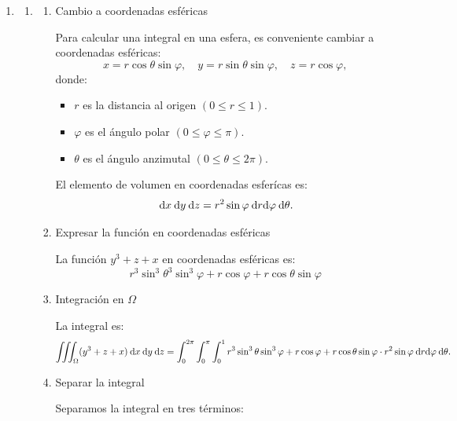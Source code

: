 \begin{enumerate}[label=\color{red}\textbf{\arabic*)}, leftmargin=*]
\item {}
\begin{enumerate}[label=\color{red}\textbf{\alph*)}]
\item {}

  \begin{enumerate}[label=\arabic*)]
    \item Cambio a coordenadas esféricas

      Para calcular una integral en una esfera, es conveniente cambiar a coordenadas esféricas: \[
      x=r\cos\theta\sin\varphi,\quad y=r\sin\theta\sin\varphi, \quad z=r\cos\varphi,
      \] donde:
      \begin{itemize}[label=\textbullet]
        \item $r$ es la distancia al origen $(0\le r\le 1)$.
        \item $\varphi$ es el ángulo polar $(0\le \varphi\le \pi)$.
        \item $\theta$ es el ángulo anzimutal $(0\le \theta\le 2\pi)$.
      \end{itemize}
      El elemento de volumen en coordenadas esferícas es: \[
      \:\mathrm{d}x \:\mathrm{d}y \:\mathrm{d}z =r^2 \sin\varphi\:\mathrm{d}r \mathrm{d}\varphi\:\mathrm{d}\theta .
      \] 
    \item Expresar la función en coordenadas esféricas

      La función $y^3+z+x$ en coordenadas esféricas es: \[
      r^3 \sin^3\theta^3 \sin^3\varphi + r \cos\varphi + r \cos \theta \sin \varphi
      \] 

    \item Integración en $\Omega$

      La integral es: \[
    \iiint_{\Omega}(y^3+z+x)\:\mathrm{d}x \:\mathrm{d}y \:\mathrm{d}z=\int_{0}^{2\pi} \int_{0}^{\pi} \int_{0}^{1} r^3 \sin ^3\theta \sin ^3\varphi+r \cos\varphi+r \cos\theta \sin \varphi\cdot  r^2\sin\varphi\:\mathrm{d}r \mathrm{d}\varphi\:\mathrm{d}\theta .
    \] 

  \item Separar la integral

    Separamos la integral en tres términos:


\end{enumerate}
\end{enumerate}
\end{enumerate}
